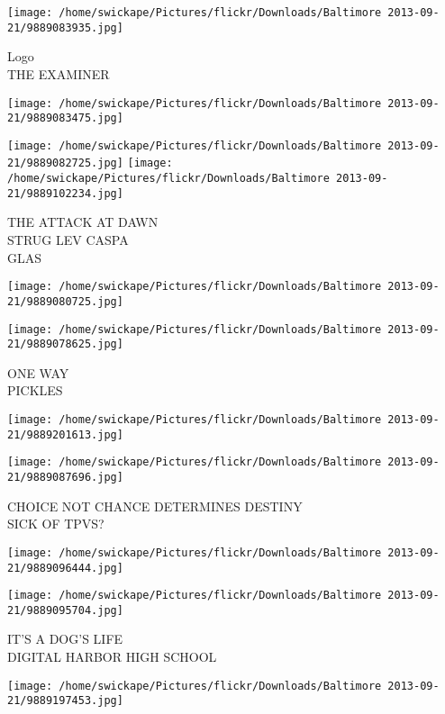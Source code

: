 \documentclass[10pt,letterpaper]{article}
\begin{document}
\vspace{0.25in}
\texttt{[image: /home/swickape/Pictures/flickr/Downloads/Baltimore 2013-09-21/9889083935.jpg]}

Logo\\
THE EXAMINER
\pagebreak

\texttt{[image: /home/swickape/Pictures/flickr/Downloads/Baltimore 2013-09-21/9889083475.jpg]}

\vspace{0.25in}
\texttt{[image: /home/swickape/Pictures/flickr/Downloads/Baltimore 2013-09-21/9889082725.jpg]}
\texttt{[image: /home/swickape/Pictures/flickr/Downloads/Baltimore 2013-09-21/9889102234.jpg]}

THE ATTACK AT DAWN\\
STRUG LEV CASPA\\
GLAS
\pagebreak

\texttt{[image: /home/swickape/Pictures/flickr/Downloads/Baltimore 2013-09-21/9889080725.jpg]}

\vspace{0.25in}
\texttt{[image: /home/swickape/Pictures/flickr/Downloads/Baltimore 2013-09-21/9889078625.jpg]}

ONE WAY\\
PICKLES
\pagebreak

\texttt{[image: /home/swickape/Pictures/flickr/Downloads/Baltimore 2013-09-21/9889201613.jpg]}

\vspace{0.25in}
\texttt{[image: /home/swickape/Pictures/flickr/Downloads/Baltimore 2013-09-21/9889087696.jpg]}

CHOICE NOT CHANCE DETERMINES DESTINY\\
SICK OF TPVS?
\pagebreak

\texttt{[image: /home/swickape/Pictures/flickr/Downloads/Baltimore 2013-09-21/9889096444.jpg]}

\vspace{0.25in}
\texttt{[image: /home/swickape/Pictures/flickr/Downloads/Baltimore 2013-09-21/9889095704.jpg]}

IT'S A DOG'S LIFE\\
DIGITAL HARBOR HIGH SCHOOL
\pagebreak

\texttt{[image: /home/swickape/Pictures/flickr/Downloads/Baltimore 2013-09-21/9889197453.jpg]}
\end{document}
